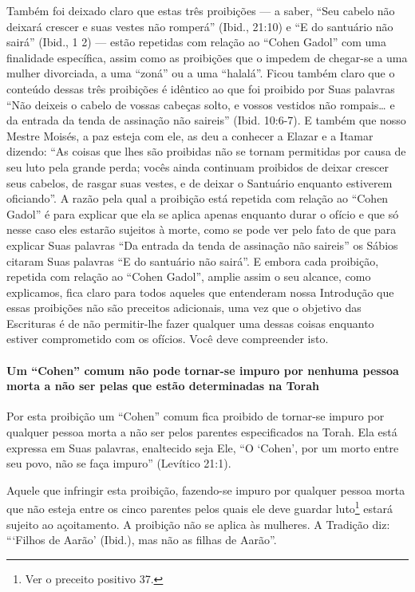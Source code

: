 Também foi deixado claro que estas três proibições --- a saber, ``Seu
cabelo não deixará crescer e suas vestes não romperá'' (Ibid., 21:10) e
``E do santuário não sairá'' (Ibid., 1 2) --- estão repetidas com
relação ao ``Cohen Gadol'' com uma finalidade específica, assim como as
proibições que o impedem de chegar-se a uma mulher divorciada, a uma
``zoná'' ou a uma ``halalá''. Ficou também claro que o conteúdo dessas
três proibições é idêntico ao que foi proibido por Suas palavras ``Não
deixeis o cabelo de vossas cabeças solto, e vossos vestidos não
rompais\ldots{} e da entrada da tenda de assinação não saireis'' (Ibid.
10:6-7). E também que nosso Mestre Moisés, a paz esteja com ele, as deu
a conhecer a Elazar e a Itamar dizendo: ``As coisas que lhes são
proibidas não se tornam permitidas por causa de seu luto pela grande
perda; vocês ainda continuam proibidos de deixar crescer seus cabelos,
de rasgar suas vestes, e de deixar o Santuário enquanto estiverem
oficiando''. A razão pela qual a proibição está repetida com relação ao
``Cohen Gadol'' é para explicar que ela se aplica apenas enquanto durar
o ofício e que só nesse caso eles estarão sujeitos à morte, como se
pode ver pelo fato de que para explicar Suas palavras ``Da entrada da
tenda de assinação não saireis'' os Sábios citaram Suas palavras ``E do
santuário não sairá''. E embora cada proibição, repetida com relação ao
``Cohen Gadol'', amplie assim o seu alcance, como explicamos, fica claro
para todos aqueles que entenderam nossa Introdução que essas proibições
não são preceitos adicionais, uma vez que o objetivo das Escrituras é
de não permitir-lhe fazer qualquer uma dessas coisas enquanto estiver
comprometido com os ofícios. Você deve compreender isto.

\paragraph{Um ``Cohen'' comum não pode tornar-se impuro por nenhuma pessoa
morta a não ser pelas que estão determinadas na Torah}

Por esta proibição um ``Cohen'' comum fica proibido de tornar-se impuro
por qualquer pessoa morta a não ser pelos parentes especificados na
Torah. Ela está expressa em Suas palavras, enaltecido seja Ele, ``O
`Cohen', por um morto entre seu povo, não se faça impuro'' (Levítico
21:1).

Aquele que infringir esta proibição, fazendo-se impuro por qualquer
pessoa morta que não esteja entre os cinco parentes pelos quais ele deve
guardar luto\footnote{Ver o preceito positivo 37.} estará sujeito ao açoitamento. A
proibição não se aplica às mulheres. A Tradição diz: ```Filhos de
Aarão' (Ibid.), mas não as filhas de Aarão''.


